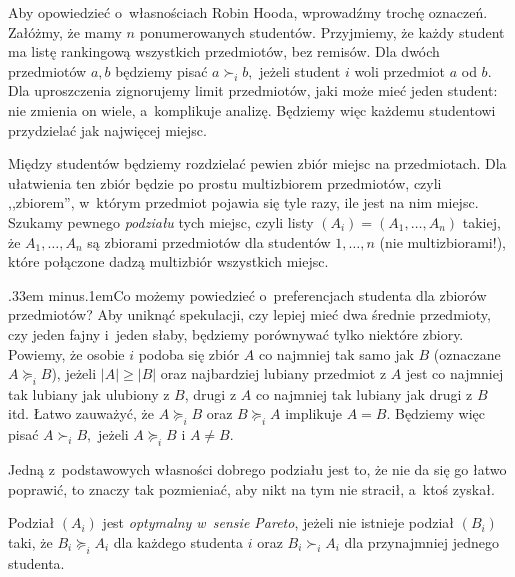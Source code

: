Aby opowiedzieć o~własnościach Robin Hooda, wprowadźmy trochę oznaczeń. 
Załóżmy, że mamy $n$ ponumerowanych studentów.
Przyjmiemy, że każdy student  ma listę rankingową wszystkich przedmiotów, bez remisów. Dla dwóch przedmiotów $a,b$ będziemy pisać $a \succ_i b,$ jeżeli student $i$ woli przedmiot $a$ od $b$. 
Dla uproszczenia zignorujemy limit przedmiotów, jaki może mieć jeden student: nie zmienia on wiele, a~komplikuje analizę. Będziemy więc każdemu studentowi przydzielać jak najwięcej miejsc.

Między studentów będziemy rozdzielać pewien zbiór miejsc na przedmiotach.
Dla ułatwienia ten zbiór będzie po prostu multizbiorem przedmiotów, czyli ,,zbiorem'', w~którym przedmiot pojawia się tyle razy, ile jest na nim miejsc.
Szukamy pewnego \emph{podziału} tych miejsc, czyli listy $(A_i) = (A_1, \dots, A_n)$ takiej, że $A_1, \dots, A_n$ są zbiorami przedmiotów dla studentów $1,\dots,n$ (nie multizbiorami!), które połączone dadzą multizbiór wszystkich miejsc.

 {\spaceskip.33em minus.1emCo możemy powiedzieć o~preferencjach studenta dla zbiorów przedmiotów?
Aby uniknąć spekulacji, czy lepiej mieć dwa średnie przedmioty, czy jeden fajny i~jeden słaby, będziemy porównywać tylko niektóre zbiory.
Powiemy, że osobie $i$ podoba się zbiór $A$ co najmniej tak samo jak $B$ (oznaczane $A \succeq_i B$), jeżeli $|A| \ge |B|$ oraz najbardziej lubiany przedmiot z $A$ jest co najmniej tak lubiany jak ulubiony z $B$, drugi z $A$ co najmniej tak lubiany jak drugi z $B$ itd.
Łatwo zauważyć, że $A \succeq_i B$ oraz $B \succeq_i A$ implikuje $A = B$.
Będziemy więc pisać $A \succ_i B,$ jeżeli $A \succeq_i B$ i $A \neq B$.}

Jedną z~podstawowych własności dobrego podziału jest to, że nie da się go łatwo poprawić, to znaczy tak pozmieniać, aby nikt na tym nie stracił, a~ktoś zyskał.

{ 
Podział $(A_i)$ jest \emph{\color{magenta} optymalny w~sensie Pareto}, jeżeli nie istnieje podział $(B_i)$ taki, że $B_i \succeq_i A_i$ dla każdego studenta $i$ oraz $B_i \succ_i A_i$ dla przynajmniej jednego studenta.
\par}

